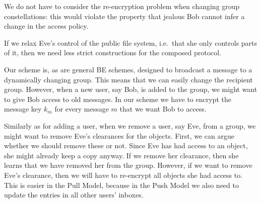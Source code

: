 We do not have to consider the re-encryption problem when changing group 
constellations: this would violate the property that jealous Bob cannot infer 
a change in the access policy.

If we relax Eve's control of the public file system, i.e.\ that she only 
controls parts of it, then we need less strict constructions for the composed 
protocol.

Our scheme is, as are general \ac{BE} schemes, designed to broadcast a message 
to a dynamically changing group.
This means that we can easily change the recipient group.
However, when a new user, say Bob, is added to the group, we might want to give 
Bob access to old messages.
In our scheme we have to encrypt the message key \(k_m\) for every message 
\(m\) that we want Bob to access.

Similarly as for adding a user, when we remove a user, say Eve, from a group, 
we might want to remove Eve's clearances for the objects.
First, we can argue whether we should remove these or not.
Since Eve has had access to an object, she might already keep a copy anyway.
If we remove her clearance, then she learns that we have removed her from the 
group.
However, if we want to remove Eve's clearance, then we will have to re-encrypt 
all objects she had access to.
This is easier in the Pull Model, because in the Push Model we also need to 
update the entries in all other users' inboxes.


